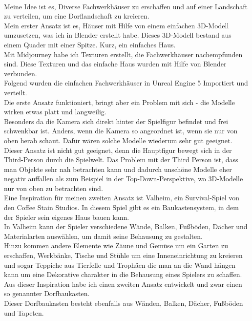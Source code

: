 \documentclass[10pt,a4paper,bibliography=totocnumbered,listof=totocnumbered]{scrartcl}
\begin{document}
\\
Meine Idee ist es, Diverse Fachwerkhäuser zu erschaffen und auf einer Landschaft zu verteilen, um eine Dorflandschaft zu kreieren.
\\
Mein erster Ansatz ist es, Häuser mit Hilfe von einem einfachen 3D-Modell umzusetzen, was ich in Blender erstellt habe. Dieses 3D-Modell bestand aus einem Quader mit einer Spitze. Kurz, ein einfaches Haus.
\\
Mit Midjourney habe ich Texturen erstellt, die Fachwerkhäuser nachempfunden sind. Diese Texturen und das einfache Haus wurden mit Hilfe von Blender verbunden. 
\\
Folgend wurden die einfachen Fachwerkhäuser in Unreal Engine 5 Importiert und verteilt.
\\
Die erste Ansatz funktioniert, bringt aber ein Problem mit sich - die Modelle wirken etwas platt und langweilig. 
\\
Besonders da die Kamera sich direkt hinter der Spielfigur befindet und frei schwenkbar ist. Anders, wenn die Kamera so angeordnet ist, wenn sie nur von oben herab schaut. Dafür wären solche Modelle wiederum sehr gut geeignet.
\\
Dieser Ansatz ist nicht gut geeignet, denn die Hauptfigur bewegt sich in der Third-Person durch die Spielwelt. Das Problem mit der Third Person ist, dass man Objekte sehr nah betrachten kann und dadurch unschöne Modelle eher  negativ auffallen als zum Beispiel in der Top-Down-Perspektive, wo 3D-Modelle nur von oben zu betrachten sind.
\\
Eine Inspiration für meinen zweiten Ansatz ist Valheim, ein Survival-Spiel von den Coffee Stain Studios. In diesem Spiel gibt es ein Baukastensystem, in dem der Spieler sein eigenes Haus bauen kann.
\\
In Valheim kann der Spieler verschiedene Wände, Balken, Fußböden, Dächer und Materialarten auswählen, um damit seine Behausung zu gestalten.
\\
Hinzu kommen andere Elemente wie Zäune und Gemüse um ein Garten zu erschaffen, Werkbänke, Tische und Stühle um eine Inneneinrichtung zu kreieren und sogar Teppiche aus Tierfelle und Trophäen die man an die Wand hängen kann um eine Dekorative charakter in die Behausung eines Spielers zu schaffen.
\\
Aus dieser Inspiration habe ich einen zweiten Ansatz entwickelt und zwar einen so genannter Dorfbaukasten.
\\
Dieser Dorfbaukasten besteht ebenfalls aus Wänden, Balken, Dächer, Fußböden und Tapeten.
\end{document}
